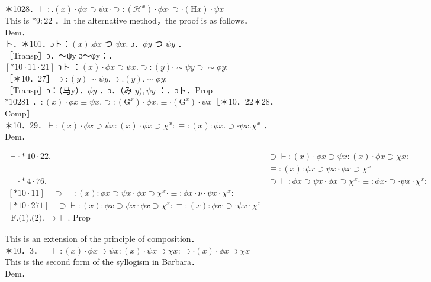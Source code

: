 \documentclass[10pt]{article}
\begin{document}
＊1028．$\vdash: .(x) \cdot \phi x \supset \psi x \cdot \supset:\left(\mathcal{H}^{x}\right) \cdot \phi x \cdot \supset \cdot(\mathrm{H} x) \cdot \psi x$\\
This is $* 9: 22$ ．In the alternative method，the proof is as follows．\\
Dem．\\
ト．＊101．ɔト：$(x) . \phi x$ つ $\psi x$. ɔ．$\phi y$ つ $\psi y$ ．\\
［Transp］ɔ．～ψy ɔ～φy：．\\
$[* 10 \cdot 11 \cdot 21]$ วト ：$(x) \cdot \phi x \supset \psi x . \supset:(y) \cdot \sim \psi y \supset \sim \phi y:$\\
［＊10．27］$\supset:(y) \sim \psi y . \supset .(y) . \sim \phi y:$\\
［Transp］ɔ：（马y）．$\phi y$ ．ɔ．（み $y), \psi y$ ：．ɔト．Prop\\
$* 10281$ ．$:(x) \cdot \phi x \equiv \psi x . \supset:\left(\mathrm{G}^{x}\right) \cdot \phi x . \equiv \cdot\left(\mathrm{G}^{x}\right) \cdot \psi x$［＊10．22＊28．Comp］\\
＊10．29．$\vdash:(x) \cdot \phi x \supset \psi x:(x) \cdot \phi x \supset \chi^{x}: \equiv:(x): \phi x . \supset \cdot \psi x . \chi^{x}$ ．\\
Dem．

\[
\begin{array}{cc}
\vdash \cdot * 10 \cdot 22 . & \supset \vdash:(x) \cdot \phi x \supset \psi x:(x) \cdot \phi x \supset \chi x: \\
& \equiv:(x): \phi x \supset \psi x \cdot \phi x \supset \chi^{x} \\
\vdash \cdot * 4 \cdot 76 . & \supset \vdash: \phi x \supset \psi x \cdot \phi x \supset \chi^{x} \cdot \equiv: \phi x \cdot \supset \cdot \psi x \cdot \chi^{x}: \\
{[* 10 \cdot 11] \quad \supset \vdash:(x): \phi x \supset \psi x \cdot \phi x \supset \chi^{x} \cdot \equiv: \phi x \cdot \nu \cdot \psi x \cdot \chi^{x}:} \\
{[* 10 \cdot 271] \quad \supset \vdash:(x): \phi x \supset \psi x \cdot \phi x \supset \chi^{x}: \equiv:(x): \phi x \cdot \supset \cdot \psi x \cdot \chi^{x}}  \tag{2}\\
\text { F.(1).(2). } \supset \vdash . \text { Prop }
\end{array}
\]

This is an extension of the principle of composition．\\
＊10．3．$\quad \vdash:(x) \cdot \phi x \supset \psi x:(x) \cdot \psi x \supset \chi x: \supset \cdot(x) \cdot \phi x \supset \chi x$\\
This is the second form of the syllogism in Barbara．\\
Dem．
\end{document}
